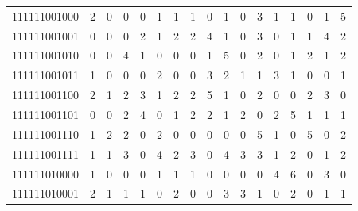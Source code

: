 \documentclass[10pt,a4paper]{article}
\begin{document}
\begin{longtable}{ |c|c|c|c|c|c|c|c|c|c|c|c|c|c|c|c|c| }
    111111001000              & 2                            & 0                                & 0                            & 0                              & 1   & 1   & 1   & 0   & 1   & 0   & 3   & 1   & 1   & 0   & 1   & 5   \\
    111111001001              & 0                            & 0                                & 0                            & 2                              & 1   & 2   & 2   & 4   & 1   & 0   & 3   & 0   & 1   & 1   & 4   & 2   \\
    111111001010              & 0                            & 0                                & 4                            & 1                              & 0   & 0   & 0   & 1   & 5   & 0   & 2   & 0   & 1   & 2   & 1   & 2   \\
    111111001011              & 1                            & 0                                & 0                            & 0                              & 2   & 0   & 0   & 3   & 2   & 1   & 1   & 3   & 1   & 0   & 0   & 1   \\
    111111001100              & 2                            & 1                                & 2                            & 3                              & 1   & 2   & 2   & 5   & 1   & 0   & 2   & 0   & 0   & 2   & 3   & 0   \\
    111111001101              & 0                            & 0                                & 2                            & 4                              & 0   & 1   & 2   & 2   & 1   & 2   & 0   & 2   & 5   & 1   & 1   & 1   \\
    111111001110              & 1                            & 2                                & 2                            & 0                              & 2   & 0   & 0   & 0   & 0   & 0   & 5   & 1   & 0   & 5   & 0   & 2   \\
    111111001111              & 1                            & 1                                & 3                            & 0                              & 4   & 2   & 3   & 0   & 4   & 3   & 3   & 1   & 2   & 0   & 1   & 2   \\
    111111010000              & 1                            & 0                                & 0                            & 0                              & 1   & 1   & 1   & 0   & 0   & 0   & 0   & 4   & 6   & 0   & 3   & 0   \\
    111111010001              & 2                            & 1                                & 1                            & 1                              & 0   & 2   & 0   & 0   & 3   & 3   & 1   & 0   & 2   & 0   & 1   & 1   \\

\end{longtable}
\end{document}
